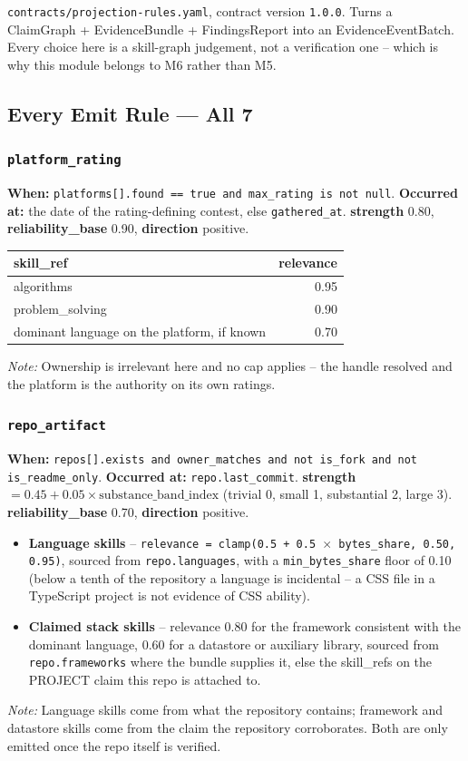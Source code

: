 \documentclass[10pt,a4paper]{article}
\begin{document}
\texttt{contracts/projection-rules.yaml}, contract version \texttt{1.0.0}.
Turns a ClaimGraph + EvidenceBundle + FindingsReport into an
EvidenceEventBatch. Every choice here is a skill-graph judgement, not a
verification one -- which is why this module belongs to M6 rather than M5.

\subsection{Every Emit Rule --- All 7}

\subsubsection*{\texttt{platform\_rating}}
\textbf{When:} \texttt{platforms[].found == true and max\_rating is not null}.
\textbf{Occurred at:} the date of the rating-defining contest, else
\texttt{gathered\_at}. \textbf{strength} 0.80, \textbf{reliability\_base}
0.90, \textbf{direction} positive.
\begin{center}\small\begin{tabular}{@{}lr@{}}\toprule skill\_ref & relevance \\\midrule
algorithms & 0.95 \\ problem\_solving & 0.90 \\ dominant language on the platform, if known & 0.70 \\ \bottomrule\end{tabular}\end{center}
\emph{Note:} Ownership is irrelevant here and no cap applies -- the handle
resolved and the platform is the authority on its own ratings.

\subsubsection*{\texttt{repo\_artifact}}
\textbf{When:} \texttt{repos[].exists and owner\_matches and not is\_fork and
not is\_readme\_only}. \textbf{Occurred at:} \texttt{repo.last\_commit}.
\textbf{strength} $= 0.45 + 0.05\times\text{substance\_band\_index}$ (trivial
0, small 1, substantial 2, large 3). \textbf{reliability\_base} 0.70,
\textbf{direction} positive.
\begin{itemize}
\item \textbf{Language skills} -- \texttt{relevance = clamp(0.5 + 0.5 $\times$ bytes\_share, 0.50, 0.95)}, sourced from \texttt{repo.languages}, with a \texttt{min\_bytes\_share} floor of 0.10 (below a tenth of the repository a language is incidental -- a CSS file in a TypeScript project is not evidence of CSS ability).
\item \textbf{Claimed stack skills} -- relevance 0.80 for the framework consistent with the dominant language, 0.60 for a datastore or auxiliary library, sourced from \texttt{repo.frameworks} where the bundle supplies it, else the skill\_refs on the PROJECT claim this repo is attached to.
\end{itemize}
\emph{Note:} Language skills come from what the repository contains;
framework and datastore skills come from the claim the repository
corroborates. Both are only emitted once the repo itself is verified.
\end{document}
